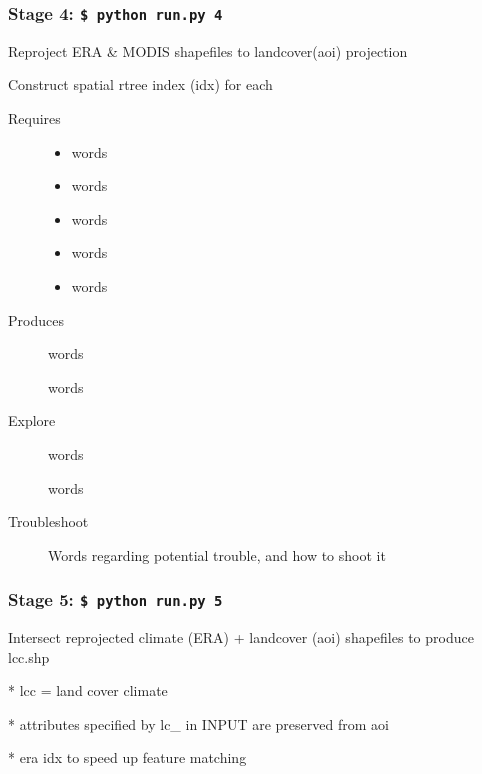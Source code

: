 \documentclass[twoside,a4paper]{refart}
\begin{document}
\subsubsection{\textbf{Stage 4:} \texttt{\$ python run.py 4}}
        Reproject ERA \& MODIS shapefiles to landcover(aoi) projection
        
       
        Construct spatial rtree index (idx) for each

  \begin{description}
    \item [Requires]
      \begin{itemize}
        \item
          words
        \item
          words
        \item
          words
        \item
          words
        \item
          words

      \end{itemize}
  
  
    \item [Produces]
      words
      
      words
      

    \item [Explore]
      words
      
      words

    \item [Troubleshoot]
      Words regarding potential trouble, and how to shoot it
  \end{description}


\subsubsection{\textbf{Stage 5:} \texttt{\$ python run.py 5}}
        Intersect reprojected climate (ERA) + landcover (aoi) shapefiles
        to produce lcc.shp
        
          * lcc = land cover climate
          
          * attributes specified by lc\_ in INPUT are preserved from aoi
          
          * era idx to speed up feature matching
\end{document}
